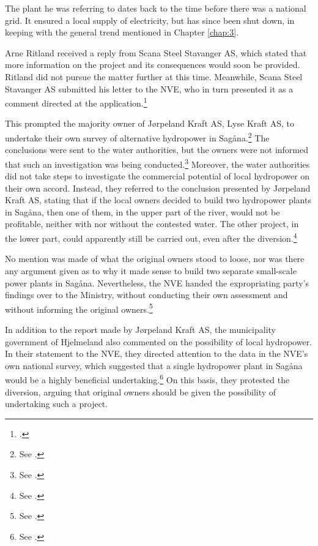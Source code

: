 The plant he was referring to dates back to the time before there was a national grid. It ensured a local supply of electricity, but has since been shut down, in keeping with the general trend mentioned in Chapter \ref{chap:3}.

Arne Ritland received a reply from Scana Steel Stavanger AS, which stated that more information on the project and its consequences would soon be provided. Ritland did not pursue the matter further at this time. Meanwhile, Scana Steel Stavanger AS submitted his letter to the NVE, who in turn presented it as a comment directed at the application.\footnote{\cite[18]{jorpeland09}.}

This prompted the majority owner of Jørpeland Kraft AS, Lyse Kraft AS, to undertake their own survey of alternative hydropower in Sagåna.\footnote{See \cite[19]{jorpeland09}.} The conclusions were sent to the water authorities, but the owners were not informed that such an investigation was being conducted.\footnote{See \cite[23]{jorpeland09}.} Moreover, the water authorities did not take steps to investigate the commercial potential of local hydropower on their own accord. Instead, they referred to the conclusion presented by Jørpeland Kraft AS, stating that if the local owners decided to build two hydropower plants in Sagåna, then one of them, in the upper part of the river, would not be profitable, neither with nor without the contested water. The other project, in the lower part, could apparently still be carried out, even after the diversion.\footnote{See \cite[23]{jorpeland09}.}

No mention was made of what the original owners stood to loose, nor was there any argument given as to why it made sense to build two separate small-scale power plants in Sagåna. Nevertheless, the NVE handed the expropriating party's findings over to the Ministry, without conducting their own assessment and without informing the original owners.\footnote{See \cite[22-23]{jorpeland09}.}

In addition to the report made by Jørpeland Kraft AS, the municipality government of Hjelmeland also commented on the possibility of local hydropower. In their statement to the NVE, they directed attention to the data in the NVE's own national survey, which suggested that a single hydropower plant in Sagåna would be a highly beneficial undertaking.\footnote{See \cite[19]{jorpeland09}.} On this basis, they protested the diversion, arguing that original owners should be given the possibility of undertaking such a project.

